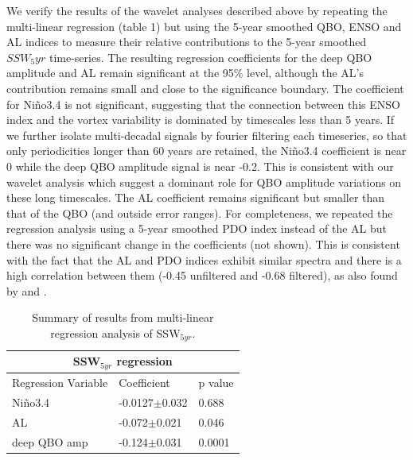 We verify the results of the wavelet analyses described above by repeating the multi-linear regression (table 1) but using the 5-year smoothed QBO, ENSO and AL indices to measure their  relative contributions to the 5-year smoothed  $SSW_5yr$ time-series. The resulting regression coefficients for the deep QBO amplitude and AL remain significant at the 95\% level, although the AL's contribution remains small and close to the significance boundary. The coefficient for Ni\~{n}o3.4 is not significant, suggesting that the connection between this ENSO index and the vortex variability is dominated by timescales less than 5 years. If we further isolate multi-decadal signals by fourier filtering each timeseries, so that only periodicities longer than 60 years are retained, the Ni\~{n}o3.4 coefficient is near 0 while the deep QBO amplitude signal is near -0.2. This is consistent with our wavelet analysis which suggest a dominant role for QBO amplitude variations on these long timescales. The AL coefficient remains significant but smaller than that of the QBO (and outside error ranges). For completeness, we repeated the regression analysis using a 5-year smoothed PDO index instead of the AL but there was no significant change in the coefficients (not shown). This is consistent with the fact that the AL and PDO indices exhibit similar spectra and there is a high correlation between them (-0.45 unfiltered and -0.68 filtered), as also found by \cite{mantuaPacific1997} and \cite{rodionovSpatial2005}. 

\begin{table}
\centering
\begin{tabular}{|p{3cm}||p{3cm}|p{3cm}|}
 \hline
 \multicolumn{3}{|c|}{SSW$_{5yr}$ regression}\\
 \hline
 Regression Variable& Coefficient& p value\\
 \hline
 Ni\~{n}o3.4  & -0.0127$\pm$0.032& 0.688\\
 AL  &   -0.072$\pm$0.021  & 0.046\\
 deep QBO amp &-0.124$\pm$0.031&0.0001\\
 \hline
\end{tabular}
\begin{center}
\caption{Summary of results from multi-linear regression analysis of SSW$_{5yr}$.} 
\end{center}
\end{table}

